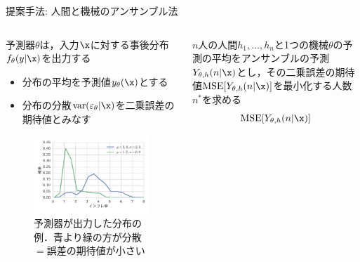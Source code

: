 \documentclass[dvipdfmx]{beamer}
\DeclareMathOperator{\MSE}{MSE}
\DeclareMathOperator{\var}{var}
\newcommand{\varm}{\var(\varepsilon_\theta|\x)}
\begin{document}
\begin{frame}{}
  \begin{block}{提案手法: 人間と機械のアンサンブル法}
    \begin{columns}
      \begin{column}{.44\textwidth}
        \begin{itembox}[l]{}
          予測器$\theta$は，\alert{入力$\x$に対する事後分布$f_\theta(y|\x)$を出力}する
          \begin{itemize}
            \item 分布の平均を予測値$y_\theta(\x)$とする
            \item 分布の\alert{分散$\varm$を二乗誤差の期待値とみなす}
          \end{itemize}
          \begin{figure}
            \centering
            \includegraphics[width=.9\textwidth]{poster-machine_outputs.pdf}
            \caption{予測器が出力した分布の例．青より緑の方が分散$=$誤差の期待値が小さい}
          \end{figure}
        \end{itembox}
        \hfill
      \end{column}
      \begin{column}{.54\textwidth}
        \begin{itembox}[l]{}
          $n$人の人間$h_1,\dots,h_n$と1つの機械$\theta$の予測の平均をアンサンブルの予測$Y_{\theta,h}(n|\x)$とし，その\alert{二乗誤差の期待値$\MSE[Y_{\theta,h}(n|\x)]$を最小化する人数$n^\ast$を求める}
          \begin{equation*}
            \MSE[Y_{\theta,h}(n|\x)]

\end{equation*}
\end{itembox}
\end{column}
\end{columns}
\end{block}
\end{frame}
\end{document}
